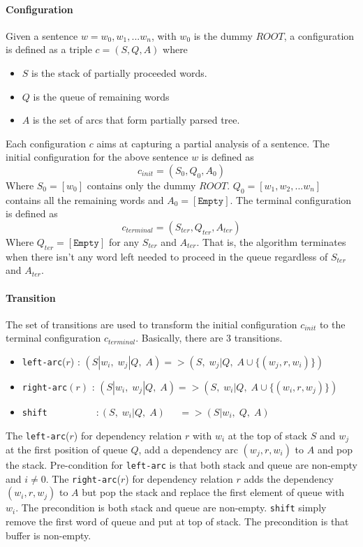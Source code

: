 \documentclass[12pt,twoside,final,hidelinks]{ltthesis}
\theoremstyle{definition}
\begin{document}
\paragraph{Configuration}
Given a sentence $w = w_0,w_1, ... w_n$, with $w_0$ is the dummy $ROOT$, a configuration is defined as a triple $c=(S,Q,A) $ where 
\begin{itemize}
\item $S$ is the stack of partially proceeded words. 
\item $Q$ is the queue of remaining words 
\item $A$ is the set of arcs that form partially parsed tree. 
\end{itemize}
Each configuration $c$ aims at capturing a partial analysis of a sentence. The initial configuration for the above sentence $w$ is defined as 
$$c_{init}  = (S_0,Q_0,A_0)$$ 
Where $S_0 = [w_0]$ contains only the dummy $ROOT$. $Q_0 = [w_1,w_2,...w_n]$ contains all the remaining words and $A_0 = [\texttt{Empty}]$. The terminal configuration is defined as 
$$c_{terminal} = (S_{ter}, Q_{ter}, A_{ter}) $$ 
Where $Q_{ter} = [\texttt{Empty}]$ for any $S_{ter}$ and $A_{ter}$. That is, the algorithm terminates when there isn't any word left needed to proceed in the queue regardless of $S_{ter}$ and $A_{ter}$. 

\paragraph{Transition}
The set of transitions are used to transform the initial configuration $c_{init}$ to the terminal configuration $c_{terminal}$. Basically, there are 3 transitions.
\begin{itemize}
\item \texttt{left-arc}($r$)\;\; : $(S|w_i,\; w_j|Q,\; A) => (S,\;w_j|Q,\; A\cup \{(w_j,r,w_i)\})$
\item \texttt{right-arc}$(r)$ : $(S|w_i,\; w_j|Q,\; A) => (S,\;w_i|Q,\; A\cup \{(w_i,r,w_j)\})$
\item \texttt{shift}$ \;\;\;\;\;\;\;\;\;\;\;\;\;\;\;\;\;\;: (S,\; w_i|Q,\; A) \;\;\;\;\;=> (S|w_i,\;Q,\; A)$
\end{itemize}

The \texttt{left-arc}($r$) for dependency relation $r$ with $w_i$ at the top of stack $S$ and $w_j$ at the first position of queue $Q$, add a dependency arc $(w_j,r,w_i)$ to $A$ and pop the stack. Pre-condition for \texttt{left-arc} is that both stack and queue are non-empty and $i\neq0$. The \texttt{right-arc}($r$) for dependency relation $r$ adds the dependency $(w_i,r,w_j)$ to $A$ but pop the stack and replace the first element of queue with $w_i$. The precondition is both stack and queue are non-empty. \texttt{shift} simply remove the first word of queue and put at top of stack. The precondition is that buffer is non-empty. 
\end{document}
